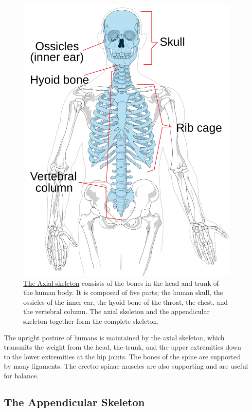 \begin{figure}

{\centering \includegraphics[width=0.7\linewidth]{./figures/locomotion/Axial_skeleton_diagram} 

}

\caption{\href{https://commons.wikimedia.org/wiki/File:Axial_skeleton_diagram.svg}{The Axial skeleton} consists of the bones in the head and trunk of the human body. It is composed of five parts; the human skull, the ossicles of the inner ear, the hyoid bone of the throat, the chest, and the vertebral column. The axial skeleton and the appendicular skeleton together form the complete skeleton.}\label{fig:axialskeleton}
\end{figure}

The upright posture of humans is maintained by the axial skeleton, which transmits the weight from the head, the trunk, and the upper extremities down to the lower extremities at the hip joints. The bones of the spine are supported by many ligaments. The erector spinae muscles are also supporting and are useful for balance.

\hypertarget{the-appendicular-skeleton}{%
\subsection{The Appendicular Skeleton}\label{the-appendicular-skeleton}}

